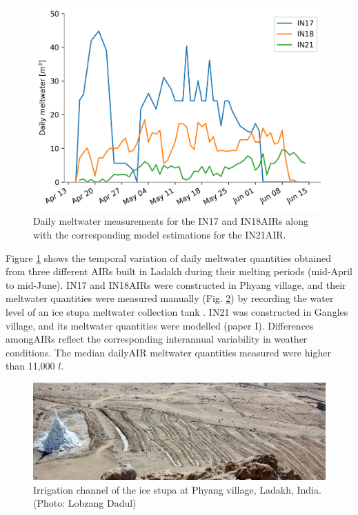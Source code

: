 \begin{figure}
	\centering
	\includegraphics[width=\textwidth]{figs/melt.png}
	\caption{Daily meltwater measurements for the IN17 and IN18\ac{AIRs} along with the corresponding model estimations
		for the IN21\ac{AIR}. }
	\label{fig:ISmelt}
\end{figure}




Figure \ref{fig:ISmelt} shows the temporal variation of daily meltwater quantities obtained from three different
AIRs built in Ladakh during their melting periods (mid-April to mid-June). IN17 and IN18\ac{AIRs} were constructed
in Phyang village, and their meltwater quantities were measured manually (Fig. \ref{fig:ISirrigation}) by recording the water level of an ice stupa meltwater collection tank
\citep{vermaIceStupaMeltwater2018}. IN21 was constructed in Gangles village, and its meltwater quantities
were modelled (paper I). Differences among\ac{AIRs} reflect the corresponding interannual variability in weather
conditions. The median daily\ac{AIR} meltwater quantities measured were higher than 11,000 $l$.

\begin{figure}
	\centering
	\includegraphics[width=\textwidth]{figs/IS_irrigation.jpeg}
	\caption{Irrigation channel of the ice stupa at Phyang village, Ladakh, India. (Photo: Lobzang Dadul) }
	\label{fig:ISirrigation}
\end{figure}

